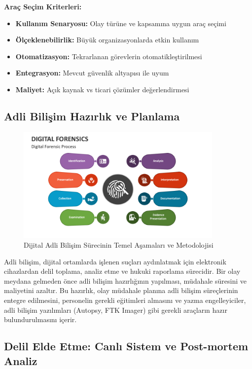 \begin{itemize}
\textbf{Araç Seçim Kriterleri:}
\begin{itemize}
    \item \textbf{Kullanım Senaryosu:} Olay türüne ve kapsamına uygun araç seçimi
    \item \textbf{Ölçeklenebilirlik:} Büyük organizasyonlarda etkin kullanım
    \item \textbf{Otomatizasyon:} Tekrarlanan görevlerin otomatikleştirilmesi
    \item \textbf{Entegrasyon:} Mevcut güvenlik altyapısı ile uyum
    \item \textbf{Maliyet:} Açık kaynak vs ticari çözümler değerlendirmesi
\end{itemize}

\subsection{Adli Bilişim Hazırlık ve Planlama}

\begin{figure}[H]
    \centering
    \includegraphics[width=0.9\textwidth]{img/digital-forensics-process.png}
    \caption{Dijital Adli Bilişim Sürecinin Temel Aşamaları ve Metodolojisi}
    \label{fig:digital-forensics-process}
\end{figure}

Adli bilişim, dijital ortamlarda işlenen suçları aydınlatmak için elektronik cihazlardan delil toplama, analiz etme ve hukuki raporlama sürecidir. Bir olay meydana gelmeden önce adli bilişim hazırlığının yapılması, müdahale süresini ve maliyetini azaltır. Bu hazırlık, olay müdahale planına adli bilişim süreçlerinin entegre edilmesini, personelin gerekli eğitimleri almasını ve yazma engelleyiciler, adli bilişim yazılımları (Autopsy, FTK Imager) gibi gerekli araçların hazır bulundurulmasını içerir.

\subsection{Delil Elde Etme: Canlı Sistem ve Post-mortem Analiz}


\end{itemize}
